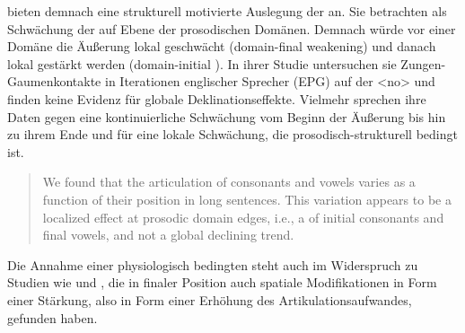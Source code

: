 \citet{Fougeron1997} bieten demnach eine strukturell motivierte Auslegung der  an. Sie betrachten  als Schwächung der  auf Ebene der prosodischen Domänen. Demnach würde vor einer Domäne die Äußerung lokal geschwächt (domain-final weakening) und danach lokal gestärkt werden (domain-initial ). In ihrer Studie untersuchen sie Zungen-Gaumenkontakte in Iterationen englischer Sprecher (EPG) auf der  <no> und finden keine Evidenz für globale Deklinationseffekte. Vielmehr sprechen ihre Daten gegen eine kontinuierliche Schwächung vom Beginn der Äußerung bis hin zu ihrem Ende und für eine lokale Schwächung, die prosodisch-strukturell bedingt ist.

\begin{quotation}
	We found that the articulation of consonants and vowels varies as a function of their position in long sentences. This variation appears to be a localized effect at prosodic domain edges, i.e., a  of initial consonants and final vowels, and not a global declining trend. \citep[][3736]{Fougeron1997}
\end{quotation}

Die Annahme einer physiologisch bedingten  steht auch im Widerspruch zu Studien wie \citet{Cho2005a} und \citet{DiNapoli2012}, die in finaler Position auch spatiale Modifikationen in Form einer Stärkung, also in Form einer Erhöhung des Artikulationsaufwandes, gefunden haben.